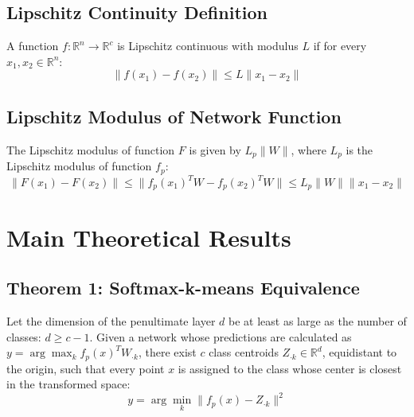\subsection{Lipschitz Continuity Definition}

A function $f : \mathbb{R}^n \rightarrow \mathbb{R}^c$ is Lipschitz continuous with modulus $L$ if for every $x_1, x_2 \in \mathbb{R}^n$:
\begin{equation}
\|f(x_1) - f(x_2)\| \leq L \|x_1 - x_2\|
\end{equation}

\subsection{Lipschitz Modulus of Network Function}

The Lipschitz modulus of function $F$ is given by $L_p \|W\|$, where $L_p$ is the Lipschitz modulus of function $f_p$:
\begin{equation}
\|F(x_1) - F(x_2)\| \leq \|f_p(x_1)^T W - f_p(x_2)^T W\| \leq L_p \|W\| \|x_1 - x_2\|
\end{equation}

\section{Main Theoretical Results}

\subsection{Theorem 1: Softmax-k-means Equivalence}

\begin{theorem}
Let the dimension of the penultimate layer $d$ be at least as large as the number of classes: $d \geq c - 1$. Given a network whose predictions are calculated as $y = \arg \max_k f_p(x)^T W_{\cdot k}$, there exist $c$ class centroids $Z_{\cdot k} \in \mathbb{R}^d$, equidistant to the origin, such that every point $x$ is assigned to the class whose center is closest in the transformed space:
\begin{equation}
y = \arg \min_k \|f_p(x) - Z_{\cdot k}\|^2
\end{equation}
\end{theorem}

